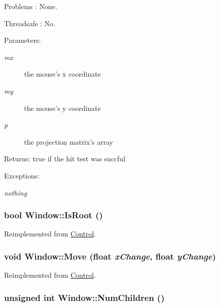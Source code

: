 Problems : None.

Threadsafe : No.

\begin{Desc}
\item[Parameters:]
\begin{description}
\item[{\em mx}]the mouse's x coordinate \item[{\em my}]the mouse's y coordinate \item[{\em p}]the projection matrix's array \end{description}
\end{Desc}
\begin{Desc}
\item[Returns:]true if the hit test was succful \end{Desc}
\begin{Desc}
\item[Exceptions:]
\begin{description}
\item[{\em nothing}]\end{description}
\end{Desc}
\hypertarget{class_window_9104959ec00d2c1dc16eb20303a6f7b7}{
\subsubsection[{IsRoot}]{\setlength{\rightskip}{0pt plus 5cm}bool Window::IsRoot ()}}
\label{class_window_9104959ec00d2c1dc16eb20303a6f7b7}




Reimplemented from \hyperlink{class_control_722115b12e4f4c66a1ce8f4fba9c350f}{Control}.\hypertarget{class_window_88ad9940f1705d2f635bdefc70384d17}{
\subsubsection[{Move}]{\setlength{\rightskip}{0pt plus 5cm}void Window::Move (float {\em xChange}, \/  float {\em yChange})}}
\label{class_window_88ad9940f1705d2f635bdefc70384d17}




Reimplemented from \hyperlink{class_control_8ba2e26364554895c0581a6d3e569649}{Control}.\hypertarget{class_window_8102d7f108485e1faf660d158d0070e8}{
\subsubsection[{NumChildren}]{\setlength{\rightskip}{0pt plus 5cm}unsigned int Window::NumChildren ()}}
\label{class_window_8102d7f108485e1faf660d158d0070e8}




